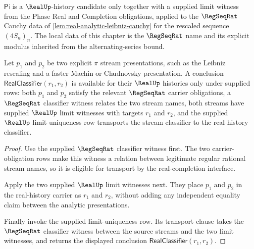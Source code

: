 \begin{definition}[Constructive \(\pi\)]
\label{def:real-analytic-pi}
$\mathsf{Pi}$ is a $\RealUp$-history candidate only together with a supplied limit witness from the Phase Real and Completion obligations, applied to the $\RegSeqRat$ Cauchy data of \autoref{lem:real-analytic-leibniz-cauchy} for the rescaled sequence $(4 S_n)_n$. The local data of this chapter is the $\RegSeqRat$ name and its explicit modulus inherited from the alternating-series bound.
\end{definition}

\begin{theorem}
\label{thm:real-analytic-series-variant-equivalence-boundary}
Let $p_1$ and $p_2$ be two explicit $\pi$ stream presentations, such as the
Leibniz rescaling and a faster Machin or Chudnovsky presentation. A conclusion
$\mathsf{RealClassifier}(r_1,r_2)$ is available for their $\RealUp$ histories
only under supplied rows: both $p_1$ and $p_2$ satisfy the relevant
$\RegSeqRat$ carrier obligations, a $\RegSeqRat$ classifier witness relates the
two stream names, both streams have supplied $\RealUp$ limit witnesses with
targets $r_1$ and $r_2$, and the supplied $\RealUp$ limit-uniqueness row
transports the stream classifier to the real-history classifier.
\end{theorem}
\begin{proof}
Use the supplied $\RegSeqRat$ classifier witness first. The two
carrier-obligation rows make this witness a relation between legitimate regular
rational stream names, so it is eligible for transport by the real-completion
interface.

Apply the two supplied $\RealUp$ limit witnesses next. They place $p_1$ and
$p_2$ in the real-history carrier as $r_1$ and $r_2$, without adding any
independent equality claim between the analytic presentations.

Finally invoke the supplied limit-uniqueness row. Its transport clause takes the
$\RegSeqRat$ classifier witness between the source streams and the two limit
witnesses, and returns the displayed conclusion
$\mathsf{RealClassifier}(r_1,r_2)$.
\end{proof}

